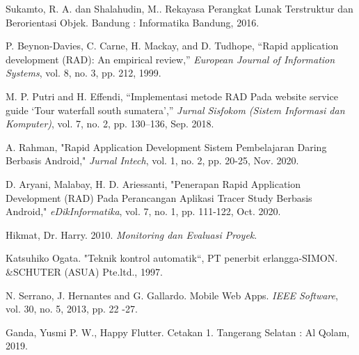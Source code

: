 \begin{thebibliography}{7}
Sukamto, R. A. dan Shalahudin, M.. Rekayasa Perangkat Lunak Terstruktur dan Berorientasi Objek. Bandung : Informatika Bandung, 2016.

P. Beynon-Davies, C. Carne, H. Mackay, and D. Tudhope, “Rapid application development (RAD): An empirical review,” \emph{European Journal of Information Systems}, vol. 8, no. 3, pp. 212, 1999. 

M. P. Putri and H. Effendi, “Implementasi metode RAD Pada website  service guide ‘Tour waterfall south sumatera’,” \emph{Jurnal Sisfokom (Sistem Informasi dan Komputer)}, vol. 7, no. 2, pp. 130–136, Sep. 2018. 

A. Rahman, "Rapid Application Development Sistem Pembelajaran Daring Berbasis Android," \emph{Jurnal Intech}, vol. 1, no. 2, pp. 20-25, Nov. 2020.

D. Aryani, Malabay, H. D. Ariessanti, "Penerapan Rapid Application Development (RAD) Pada Perancangan Aplikasi Tracer Study Berbasis Android," \emph{eDikInformatika}, vol. 7, no. 1, pp. 111-122, Oct. 2020.

Hikmat, Dr. Harry. 2010. \emph{Monitoring dan Evaluasi Proyek}.

Katsuhiko Ogata. "Teknik kontrol automatik“, PT penerbit erlangga-SIMON. \&SCHUTER (ASUA) Pte.ltd., 1997.

N. Serrano, J. Hernantes and G. Gallardo. Mobile Web Apps. \emph{IEEE Software}, vol. 30, no. 5, 2013, pp. 22 -27.

Ganda, Yusmi P. W., Happy Flutter. Cetakan 1. Tangerang Selatan : Al Qolam, 2019.


\end{thebibliography}
